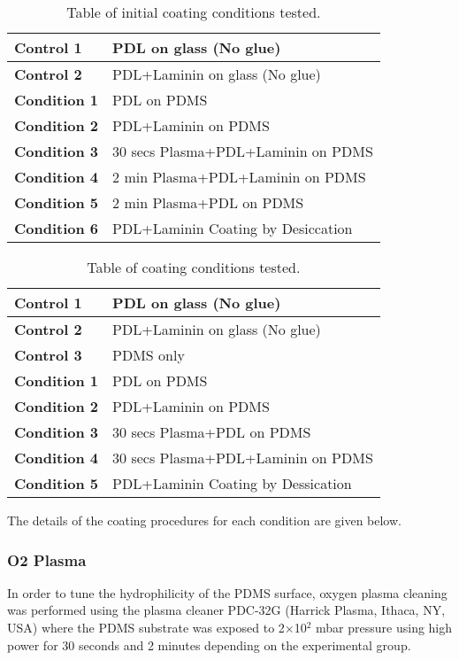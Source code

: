 \documentclass{book}
\begin{document}
\begin{table}[H]
    \centering
    \begin{tabular}{| m{2.5cm}| m{6.5cm} |}
        \hline
\textbf{Control 1} & PDL on glass (No glue) \\ 
\hline
\textbf{Control 2} & PDL+Laminin on glass (No glue) \\ 
\hline
\textbf{Condition 1} & PDL on PDMS \\ 
\hline
\textbf{Condition 2} & PDL+Laminin on PDMS \\ 
\hline
\textbf{Condition 3} & 30 secs Plasma+PDL+Laminin on PDMS \\ 
\hline
\textbf{Condition 4} & 2 min Plasma+PDL+Laminin on PDMS \\ 
\hline
\textbf{Condition 5} & 2 min Plasma+PDL on PDMS \\ 
\hline
\textbf{Condition 6} & PDL+Laminin Coating by Desiccation \\
\hline
\end{tabular}
\caption{Table of initial coating conditions tested.}
\label{table:1}
\end{table}


\begin{table}[H]
    \centering
    \begin{tabular}{| m{2.5cm}| m{6.5cm} | }
         \hline
\textbf{Control 1} & PDL on glass (No glue) \\ 
\hline
\textbf{Control 2} & PDL+Laminin on glass (No glue) \\ 
\hline
\textbf{Control 3} & PDMS only \\ 
\hline
\textbf{Condition 1} & PDL on PDMS \\ 
\hline
\textbf{Condition 2} & PDL+Laminin on PDMS \\ 
\hline
\textbf{Condition 3} & 30 secs Plasma+PDL on PDMS \\ 
\hline
\textbf{Condition 4} & 30 secs Plasma+PDL+Laminin on PDMS \\ 
\hline
\textbf{Condition 5} & PDL+Laminin Coating by Dessication \\ 
\hline
\end{tabular}
\caption{Table of coating conditions tested.}
\label{table:2}
\end{table}

The details of the coating procedures for each condition are given below. 

\subsubsection{O2 Plasma}
In order to tune the hydrophilicity of the PDMS surface, oxygen plasma cleaning was performed using the plasma cleaner PDC-32G (Harrick Plasma, Ithaca, NY, USA) where the PDMS substrate was exposed to 2$\times$10$^2$ mbar pressure using high power for 30 seconds and 2 minutes depending on the experimental group.
\end{document}

